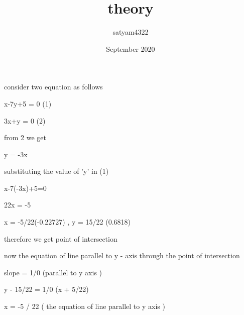 \documentclass{article}
\title{theory}
\author{satyam4322 }
\date{September 2020}
\begin{document}
consider two equation as follows

x-7y+5 = 0    (1)

3x+y = 0      (2)

from 2 we get

y = -3x

substituting the value of 'y' in (1)

x-7(-3x)+5=0

22x = -5

x = -5/22(-0.22727) , y = 15/22 (0.6818)  

therefore we get point of intersection 

now the equation of line parallel to y - axis through the point of intersection 

slope = 1/0 (parallel to y axis )

y - 15/22 = 1/0 (x + 5/22)

x = -5 / 22 ( the equation of line parallel to y axis )

 
\end{document}
